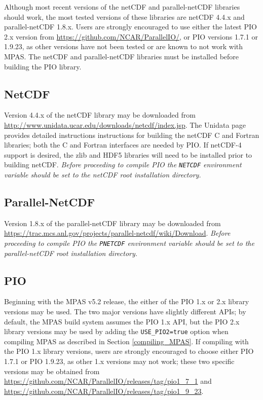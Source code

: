 Although most recent versions of the netCDF and parallel-netCDF libraries should work,
the most tested versions of these libraries are netCDF 4.4.x and parallel-netCDF 1.8.x.
Users are strongly encouraged to use either the latest PIO 2.x version from \url{https://github.com/NCAR/ParallelIO/},
or PIO versions 1.7.1 or 1.9.23, as other versions have not been tested or are known to not work with MPAS.
The netCDF and parallel-netCDF libraries must be installed before building the PIO library.

\subsection{NetCDF}
\label{serial_netcdf}

Version 4.4.x of the netCDF library may be downloaded from
\url{http://www.unidata.ucar.edu/downloads/netcdf/index.jsp}.
The Unidata page provides detailed instructions instructions for building the netCDF C and Fortran libraries;
both the C and Fortran interfaces are needed by PIO. If netCDF-4 support is desired, the zlib and HDF5 libraries
will need to be installed prior to building netCDF. {\em Before proceeding to compile PIO
the {\tt NETCDF} environment variable should be set to the netCDF root
installation directory.}

\subsection{Parallel-NetCDF}
\label{parallel_netcdf}

Version 1.8.x of the parallel-netCDF library may be downloaded from
\url{https://trac.mcs.anl.gov/projects/parallel-netcdf/wiki/Download}. {\em Before proceeding to
compile PIO the {\tt PNETCDF} environment variable should be set to the
parallel-netCDF root installation directory.}

\subsection{PIO}
\label{pio_build}

Beginning with the MPAS v5.2 release, the either of the PIO 1.x or 2.x library versions
may be used. The two major versions have slightly different APIs; by default, the MPAS build
system assumes the PIO 1.x API, but the PIO 2.x library versions may be used by
adding the {\tt USE\_PIO2=true} option when compiling MPAS as described in Section \ref{compiling_MPAS}.
If compiling with the PIO 1.x library versions, users are strongly encouraged to choose
either PIO 1.7.1 or PIO 1.9.23, as other 1.x versions may not work; these two specific versions may
be obtained from \url{https://github.com/NCAR/ParallelIO/releases/tag/pio1_7_1} and
\url{https://github.com/NCAR/ParallelIO/releases/tag/pio1_9_23}.

